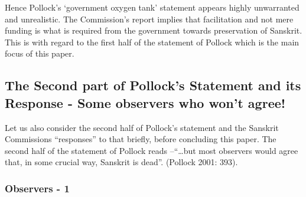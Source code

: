 Hence Pollock’s ‘government oxygen tank’ statement appears highly unwarranted and unrealistic. The Commission’s report implies that facilitation and not mere funding is what is required from the government towards preservation of Sanskrit. This is with regard to the first half of the statement of Pollock which is the main focus of this paper.   

\subsection{The Second part of Pollock’s Statement and its Response - Some observers who won’t agree!}

Let us also consider the second half of Pollock’s statement and the Sanskrit Commissions “responses” to that briefly, before concluding this paper. The second half of the statement of Pollock reads –“…but most observers would agree that, in some crucial way, Sanskrit is dead”. (Pollock 2001: 393). 

\makeatletter
\renewcommand\thesubsubsection{\thesubsection.\@alph\c@subsubsection}
\makeatother

\subsubsection{Observers - 1}

